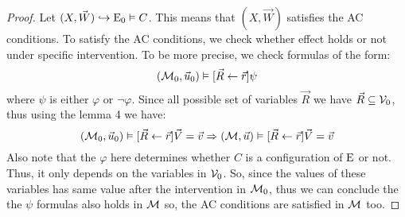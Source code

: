 \begin{theorem}
\end{theorem}
\begin{proof}
    Let $(X,\vec W) \hookrightarrow \mathrm{E}_0 \vDash C$.
    This means that $(X,\vec W)$ satisfies the AC conditions.
    To satisfy the AC conditions, we check whether effect holds or not
    under specific intervention.
    To be more precise, we check formulas of the form:
    \begin{equation*}
        (\mathcal{M}_0,\vec u_0)\vDash[\vec R \leftarrow \vec r] \psi
    \end{equation*}
    where $\psi$ is either $\varphi$ or $\neg \varphi$.
    Since all possible set of variables $\vec R$ we have
    $\vec R \subseteq \mathcal{V}_0$, thus using the lemma 4 we have:
    \begin{equation*}
        (\mathcal{M}_0,\vec u_0)\vDash[\vec R \leftarrow \vec r] \vec V = \vec v
        \Rightarrow
        (\mathcal{M},\vec u)\vDash[\vec R \leftarrow \vec r] \vec V = \vec v
    \end{equation*}
    Also note that the $\varphi$ here determines whether $C$ 
    is a configuration of $\mathrm{E}$ or not. 
    Thus, it only depends on the variables in $\mathcal{V}_0$.
    So, since the values of these variables has same value after 
    the intervention in $\mathcal{M}_0$, thus we can conclude the 
    the $\psi$ formulas also holds in $\mathcal{M}$ so, the AC conditions 
    are satisfied in $\mathcal{M}$ too.
\end{proof}
